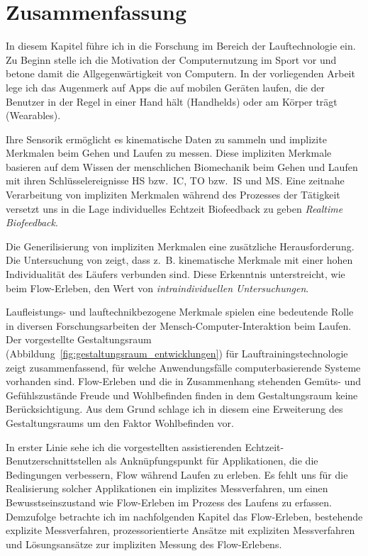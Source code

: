

\section{Zusammenfassung} 

\label{sec:zusammenfassung_2}

In diesem Kapitel führe ich in die Forschung im Bereich der Lauftechnologie ein. Zu Beginn stelle ich die Motivation der Computernutzung im Sport vor und betone damit die Allgegenwärtigkeit von Computern. In der vorliegenden Arbeit lege ich das Augenmerk auf Apps die auf mobilen Geräten laufen, die der Benutzer in der Regel in einer Hand hält (Handhelds) oder am Körper trägt (Wearables).

Ihre Sensorik ermöglicht es kinematische Daten zu sammeln und implizite Merkmalen beim Gehen und Laufen zu messen. Diese impliziten Merkmale basieren auf dem Wissen der menschlichen Biomechanik beim Gehen und Laufen mit ihren Schlüsselereignisse \ac{HS} bzw.\ \ac{IC}, \ac{TO} bzw.\ \ac{IS} und \ac{MS}. Eine zeitnahe Verarbeitung von impliziten Merkmalen während des Prozesses der Tätigkeit versetzt uns in die Lage individuelles Echtzeit Biofeedback zu geben \emph{Realtime Biofeedback}. 

Die Generilisierung von impliziten Merkmalen eine zusätzliche Herausforderung. Die Untersuchung von \citet{Strohrmann2012} zeigt, dass z.~B. kinematische Merkmale mit einer hohen Individualität des Läufers verbunden sind. Diese Erkenntnis unterstreicht, wie beim Flow-Erleben, den Wert von \emph{intraindividuellen Untersuchungen}.

Laufleistungs- und lauftechnikbezogene Merkmale spielen eine bedeutende Rolle in diversen Forschungsarbeiten der Mensch-Computer-Interaktion beim Laufen. Der vorgestellte Gestaltungsraum (Abbildung~\ref{fig:gestaltungsraum_entwicklungen}) für Lauftrainingstechnologie zeigt zusammenfassend, für welche Anwendungsfälle computerbasierende Systeme vorhanden sind. Flow-Erleben und die in Zusammenhang stehenden Gemüts- und Gefühlszustände Freude und Wohlbefinden finden in dem Gestaltungsraum keine Berücksichtigung. Aus dem Grund schlage ich in diesem eine Erweiterung des Gestaltungsraums um den Faktor Wohlbefinden vor.

In erster Linie sehe ich die vorgestellten assistierenden Echtzeit-Benutzerschnittstellen als Anknüpfungspunkt für Applikationen, die die Bedingungen verbessern, Flow während Laufen zu erleben. Es fehlt uns für die Realisierung solcher Applikationen ein implizites Messverfahren, um einen Bewusstseinszustand wie Flow-Erleben im Prozess des Laufens zu erfassen. Demzufolge betrachte ich im nachfolgenden Kapitel das Flow-Erleben, bestehende explizite Messverfahren, prozessorientierte Ansätze mit expliziten Messverfahren und Lösungsansätze zur impliziten Messung des Flow-Erlebens.

